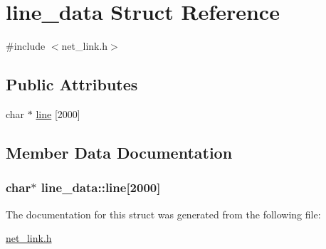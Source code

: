 \hypertarget{structline__data}{\section{line\-\_\-data Struct Reference}
\label{structline__data}
}


{\ttfamily \#include $<$net\-\_\-link.\-h$>$}

\subsection*{Public Attributes}
\begin{DoxyCompactItemize}
\item 
char $\ast$ \hyperlink{structline__data_a4816bb0d74edb1f96f72c9aeb0f4d5b6}{line} \mbox{[}2000\mbox{]}
\end{DoxyCompactItemize}


\subsection{Member Data Documentation}
\hypertarget{structline__data_a4816bb0d74edb1f96f72c9aeb0f4d5b6}{
\subsubsection[{line}]{\setlength{\rightskip}{0pt plus 5cm}char$\ast$ line\-\_\-data\-::line\mbox{[}2000\mbox{]}}}\label{structline__data_a4816bb0d74edb1f96f72c9aeb0f4d5b6}


The documentation for this struct was generated from the following file\-:\begin{DoxyCompactItemize}
\item 
\hyperlink{net__link_8h}{net\-\_\-link.\-h}\end{DoxyCompactItemize}
